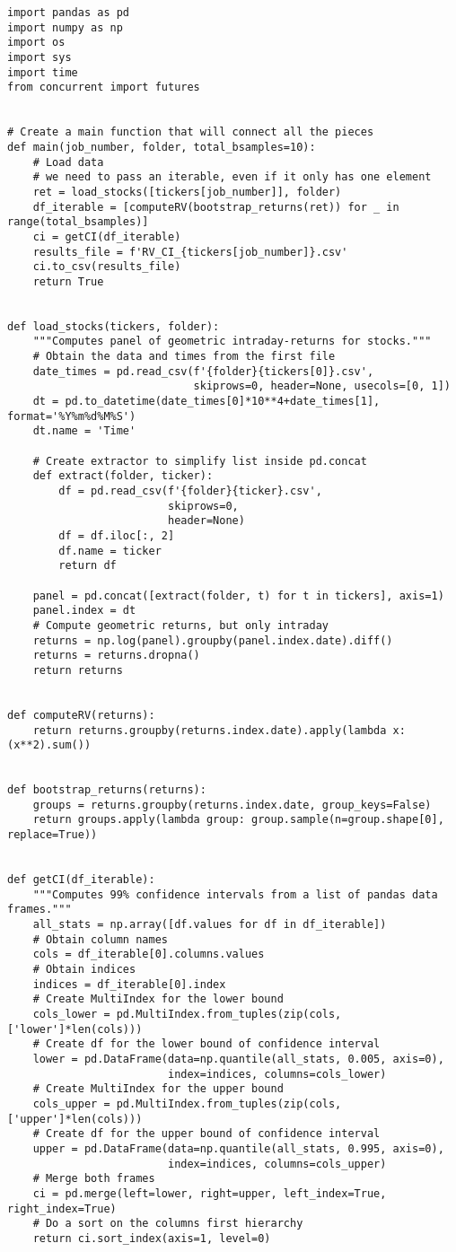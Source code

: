 \documentclass[12pt, a4paper]{article}
\begin{document}
\begin{lstlisting}
import pandas as pd
import numpy as np
import os
import sys
import time
from concurrent import futures


# Create a main function that will connect all the pieces
def main(job_number, folder, total_bsamples=10):
    # Load data
    # we need to pass an iterable, even if it only has one element
    ret = load_stocks([tickers[job_number]], folder)
    df_iterable = [computeRV(bootstrap_returns(ret)) for _ in range(total_bsamples)]
    ci = getCI(df_iterable)
    results_file = f'RV_CI_{tickers[job_number]}.csv'
    ci.to_csv(results_file)
    return True


def load_stocks(tickers, folder):
    """Computes panel of geometric intraday-returns for stocks."""
    # Obtain the data and times from the first file
    date_times = pd.read_csv(f'{folder}{tickers[0]}.csv',
                             skiprows=0, header=None, usecols=[0, 1])
    dt = pd.to_datetime(date_times[0]*10**4+date_times[1], format='%Y%m%d%M%S')
    dt.name = 'Time'

    # Create extractor to simplify list inside pd.concat
    def extract(folder, ticker):
        df = pd.read_csv(f'{folder}{ticker}.csv',
                         skiprows=0,
                         header=None)
        df = df.iloc[:, 2]
        df.name = ticker
        return df

    panel = pd.concat([extract(folder, t) for t in tickers], axis=1)
    panel.index = dt
    # Compute geometric returns, but only intraday
    returns = np.log(panel).groupby(panel.index.date).diff()
    returns = returns.dropna()
    return returns


def computeRV(returns):
    return returns.groupby(returns.index.date).apply(lambda x: (x**2).sum())


def bootstrap_returns(returns):
    groups = returns.groupby(returns.index.date, group_keys=False)
    return groups.apply(lambda group: group.sample(n=group.shape[0], replace=True))


def getCI(df_iterable):
    """Computes 99% confidence intervals from a list of pandas data frames."""
    all_stats = np.array([df.values for df in df_iterable])
    # Obtain column names
    cols = df_iterable[0].columns.values
    # Obtain indices
    indices = df_iterable[0].index
    # Create MultiIndex for the lower bound
    cols_lower = pd.MultiIndex.from_tuples(zip(cols, ['lower']*len(cols)))
    # Create df for the lower bound of confidence interval
    lower = pd.DataFrame(data=np.quantile(all_stats, 0.005, axis=0),
                         index=indices, columns=cols_lower)
    # Create MultiIndex for the upper bound
    cols_upper = pd.MultiIndex.from_tuples(zip(cols, ['upper']*len(cols)))
    # Create df for the upper bound of confidence interval
    upper = pd.DataFrame(data=np.quantile(all_stats, 0.995, axis=0),
                         index=indices, columns=cols_upper)
    # Merge both frames
    ci = pd.merge(left=lower, right=upper, left_index=True, right_index=True)
    # Do a sort on the columns first hierarchy
    return ci.sort_index(axis=1, level=0)




\end{lstlisting}
\end{document}

